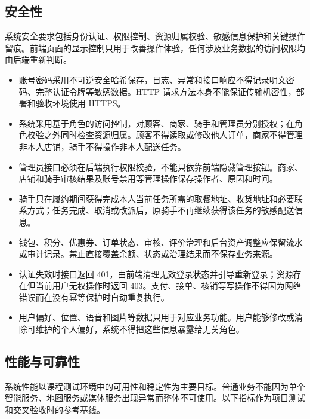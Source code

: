 \subsection{安全性}

系统安全要求包括身份认证、权限控制、资源归属校验、敏感信息保护和关键操作留痕。前端页面的显示控制只用于改善操作体验，任何涉及业务数据的访问权限均由后端重新判断。

\begin{itemize}
\item 账号密码采用不可逆安全哈希保存，日志、异常和接口响应不得记录明文密码、完整认证令牌等敏感数据。HTTP 请求方法本身不能保证传输机密性，部署和验收环境使用 HTTPS。
\item 系统采用基于角色的访问控制，对顾客、商家、骑手和管理员分别授权；在角色校验之外同时检查资源归属。顾客不得读取或修改他人订单，商家不得管理非本人店铺，骑手不得操作非本人配送任务。
\item 管理员接口必须在后端执行权限校验，不能只依靠前端隐藏管理按钮。商家、店铺和骑手审核结果及账号禁用等管理操作保存操作者、原因和时间。
\item 骑手只在履约期间获得完成本人当前任务所需的取餐地址、收货地址和必要联系方式；任务完成、取消或改派后，原骑手不再继续获得该任务的敏感配送信息。
\item 钱包、积分、优惠券、订单状态、审核、评价治理和后台资产调整应保留流水或审计记录。禁止直接覆盖余额、状态或治理结果而不保存业务来源。
\item 认证失效时接口返回 401，由前端清理无效登录状态并引导重新登录；资源存在但当前用户无权操作时返回 403。支付、接单、核销等写操作不得因为网络错误而在没有幂等保护时自动重复执行。
\item 用户偏好、位置、语音和图片等数据只用于对应业务功能。用户能够修改或清除可维护的个人偏好，系统不得把这些信息暴露给无关角色。
\end{itemize}

\subsection{性能与可靠性}

系统性能以课程测试环境中的可用性和稳定性为主要目标。普通业务不能因为单个智能服务、地图服务或媒体服务出现异常而整体不可使用。以下指标作为项目测试和交叉验收时的参考基线。

